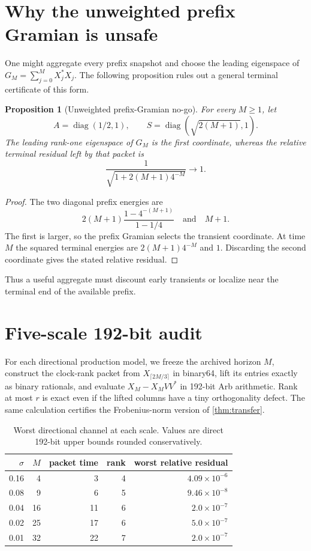 \documentclass[11pt]{article}
\newtheorem{proposition}[theorem]{Proposition}
\theoremstyle{remark}
\begin{document}
\section{Why the unweighted prefix Gramian is unsafe}

One might aggregate every prefix snapshot and choose the leading eigenspace
of $G_M=\sum_{j=0}^MX_j^*X_j$.  The following proposition rules out a general
terminal certificate of this form.

\begin{proposition}[Unweighted prefix-Gramian no-go]
\label{prop:nogo}
For every $M\ge1$, let
\[
 A=\operatorname{diag}(1/2,1),\qquad
 S=\operatorname{diag}(\sqrt{2(M+1)},1).
\]
The leading rank-one eigenspace of $G_M$ is the first coordinate, whereas the
relative terminal residual left by that packet is
\[
 \frac{1}{\sqrt{1+2(M+1)4^{-M}}}\longrightarrow1.
\]
\end{proposition}

\begin{proof}
The two diagonal prefix energies are
\[
 2(M+1)\frac{1-4^{-(M+1)}}{1-1/4}
 \quad\text{and}\quad M+1.
\]
The first is larger, so the prefix Gramian selects the transient coordinate.
At time $M$ the squared terminal energies are $2(M+1)4^{-M}$ and $1$.
Discarding the second coordinate gives the stated relative residual.
\end{proof}

Thus a useful aggregate must discount early transients or localize near the
terminal end of the available prefix.

\section{Five-scale 192-bit audit}

For each directional production model, we freeze the archived horizon $M$,
construct the clock-rank packet from $X_{\lceil2M/3\rceil}$ in binary64,
lift its entries exactly as binary rationals, and evaluate
$X_M-X_MVV^*$ in 192-bit Arb arithmetic.  Rank at most $r$ is exact even if
the lifted columns have a tiny orthogonality defect.  The same calculation
certifies the Frobenius-norm version of \cref{thm:transfer}.

\begin{table}[ht]
\centering
\small
\begin{tabular}{rrrrr}
\toprule
$\sigma$ & $M$ & packet time & rank & worst relative residual\\
\midrule
0.16 & 4 & 3 & 4 & $4.09\times10^{-6}$\\
0.08 & 9 & 6 & 5 & $9.46\times10^{-8}$\\
0.04 & 16 & 11 & 6 & $2.0\times10^{-7}$\\
0.02 & 25 & 17 & 6 & $5.0\times10^{-7}$\\
0.01 & 32 & 22 & 7 & $2.0\times10^{-7}$\\
\bottomrule
\end{tabular}
\caption{Worst directional channel at each scale.  Values are direct
192-bit upper bounds rounded conservatively.}
\label{tab:audit}
\end{table}
\end{document}
